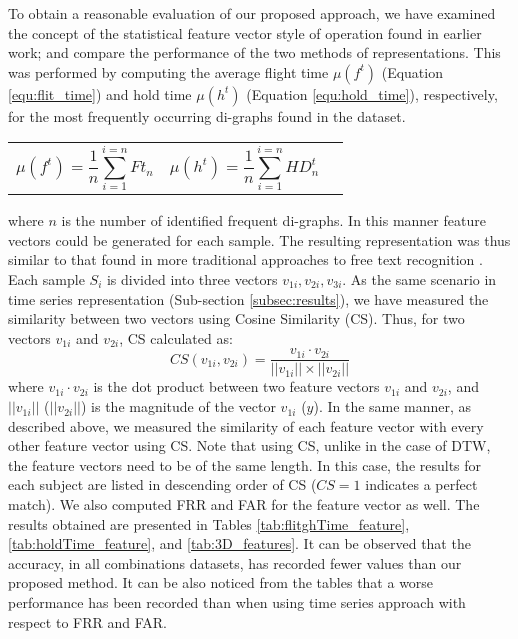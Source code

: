 \documentclass[runningheads,a4paper]{llncs}
\begin{document}
To obtain a reasonable evaluation of our proposed approach, we have examined the concept of the statistical feature vector style of operation found in earlier work; and compare the performance of the two methods of representations. This was performed by computing the average flight time $\mu(f^t)$ (Equation \ref{equ:flit_time}) and hold time $\mu(h^t)$ (Equation \ref{equ:hold_time}), respectively, for the most frequently occurring di-graphs found in the dataset.
\vspace{-0.23cm}
\noindent\begin{tabularx}{\textwidth}{@{}XXX@{}}
  \begin{equation}
	\mu(f^t)=\frac{1}{n}\sum_{i=1}^{i=n}{Ft_n} 
  \label{equ:flit_time}
  \end{equation} &
  \begin{equation}
	\mu (h^t) = \frac{1}{n} \sum_{i=1}^{i=n} {HD^t_n}
  \label{equ:hold_time}
  \end{equation}
\end{tabularx}
\noindent where $n$ is the number of identified frequent di-graphs. In this manner feature vectors could be generated for each sample. The resulting representation was thus similar to that found in more traditional approaches to free text recognition \cite{shepherd1995continuous,dowland2004long,gunetti2005keystroke,ahmed2014biometric}. Each sample $S_i$ is divided into three vectors $v_{1i},v_{2i},v_{3i}$. As the same scenario in time series representation (Sub-section \ref{subsec:results}), we have measured the similarity between two vectors using Cosine Similarity (CS). Thus, for two vectors $v_{1i}$ and $v_{2i}$, CS calculated as:
\begin{equation}
\label{equ:cosineSimilarity}
CS(v_{1i}, v_{2i}) = \frac {v_{1i} \cdot v_{2i}}{||v_{1i}|| \times ||v_{2i}||}
\end{equation}
\noindent where $v_{1i} \cdot v_{2i}$ is the dot product between two feature vectors $v_{1i}$ and $v_{2i}$, and $||v_{1i}||$ ($||v_{2i}||$) is the magnitude of the vector $v_{1i}$ ($y$). In the same manner, as described above, we measured the similarity of each feature vector with every other feature vector using CS. Note that using CS, unlike in the case of DTW, the feature vectors need to be of the same length. In this case, the results for each subject are listed in descending order of CS ($CS=1$ indicates a perfect match). We also computed FRR and FAR for the feature vector as well. The results obtained are presented in Tables \ref{tab:flitghTime_feature}, \ref{tab:holdTime_feature}, and \ref{tab:3D_features}. It can be observed that the accuracy, in all combinations datasets, has recorded fewer values than our proposed method. It can be also noticed from the tables that a worse performance has been recorded than when using time series approach with respect to FRR and FAR.
\end{document}
